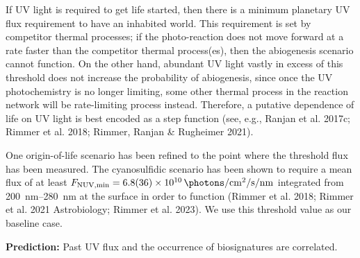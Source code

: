 \documentclass[modern,linenumbers]{aastex631}
\begin{document}
If UV light is required to get life started, then there is a minimum planetary UV flux requirement to have an inhabited world.
This requirement is set by competitor thermal processes; if the photo-reaction does not move forward at a rate faster than the competitor thermal process(es), then the abiogenesis scenario cannot function.
On the other hand, abundant UV light vastly in excess of this threshold does not increase the probability of abiogenesis, since once the UV photochemistry is no longer limiting, some other thermal process in the reaction network will be rate-limiting process instead.
Therefore, a putative dependence of life on UV light is best encoded as a step function (see, e.g., Ranjan et al. 2017c; Rimmer et al. 2018; Rimmer, Ranjan \& Rugheimer 2021).

One origin-of-life scenario has been refined to the point where the threshold flux has been measured.
The cyanosulfidic scenario has been shown to require a mean flux of at least $ F_\mathrm{NUV, min} = \SI{6.8\pm3.6 e10}{\photons\per\centi\meter\squared\per\second\per\nano\meter}$ integrated from \SIrange{200}{280}{\nano\meter} at the surface in order to function (Rimmer et al. 2018; Rimmer et al. 2021 Astrobiology; Rimmer et al. 2023).
We use this threshold value as our baseline case.

\textbf{Prediction:} Past UV flux and the occurrence of biosignatures are correlated.
\end{document}

